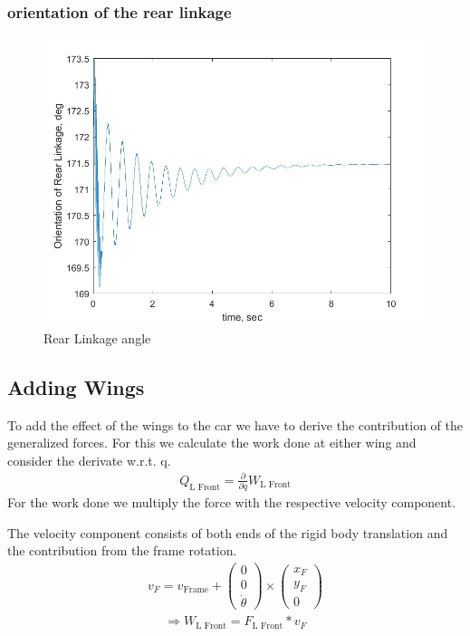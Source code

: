 \subsubsection{orientation of the rear linkage}
\begin{figure}[ht]
    \centering
    \includegraphics[scale=0.4]{images/rear_linkage_angle.jpg}
    \caption{Rear Linkage angle}
    \label{fig:rear_linkage_angle}
\end{figure}
\subsection{Adding Wings}
To add the effect of the wings to the car we have to derive the contribution of the generalized forces. For this we calculate the work done at either wing and consider the derivate w.r.t. q. 
\begin{equation}
    \begin{split}
        Q_\text{L Front} = \frac{\partial}{\partial q}W_\text{L Front}
    \end{split}
\end{equation}
For the work done we multiply the force with the respective velocity component. 

The velocity component consists of both ends of the rigid body translation and the contribution from the frame rotation.
\begin{equation}
    \begin{split}
        v_F = v_\text{Frame} + \begin{pmatrix}
            0\\0\\\dot\theta
        \end{pmatrix} \times \begin{pmatrix}
            x_F\\
            y_F\\
            0
        \end{pmatrix}
    \end{split}
\end{equation}
\begin{equation}
    \begin{split}
        \Rightarrow W_\text{L Front} = F_\text{L Front} * v_F
    \end{split}
\end{equation}
